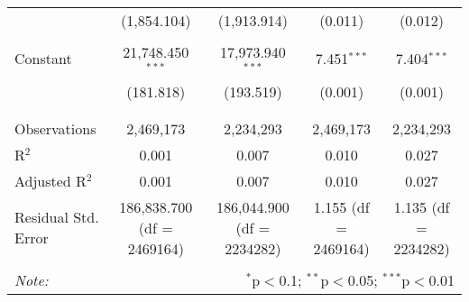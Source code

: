 \begin{table}[H]
{\begin{tabular}{@{\extracolsep{5pt}}lcccc}
   & (1,854.104) & (1,913.914) & (0.011) & (0.012) \\  

   & & & & \\  

  Constant & 21,748.450$^{***}$ & 17,973.940$^{***}$ & 7.451$^{***}$ & 7.404$^{***}$ \\  

   & (181.818) & (193.519) & (0.001) & (0.001) \\  

   & & & & \\  

 \hline \\[-1.8ex]  

 Observations & 2,469,173 & 2,234,293 & 2,469,173 & 2,234,293 \\  

 R$^{2}$ & 0.001 & 0.007 & 0.010 & 0.027 \\  

 Adjusted R$^{2}$ & 0.001 & 0.007 & 0.010 & 0.027 \\  

 Residual Std. Error & 186,838.700 (df = 2469164) & 186,044.900 (df = 2234282) & 1.155 (df = 2469164) & 1.135 (df = 2234282) \\  

 \hline  

 \hline \\[-1.8ex]  

 \textit{Note:}  & \multicolumn{4}{r}{$^{*}$p$<$0.1; $^{**}$p$<$0.05; $^{***}$p$<$0.01} \\  

 \end{tabular}}  

 \end{table}  

 



